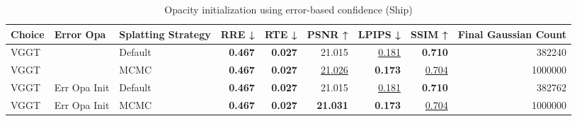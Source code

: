 \begin{table}[H]
\caption{Opacity initialization using error-based confidence (Ship)}
\label{tab:05_error_opa_ship}
\begin{tabular}{lllrrrrrr}
\toprule
Choice & Error Opa & Splatting Strategy & RRE ↓ & RTE ↓ & PSNR ↑ & LPIPS ↓ & SSIM ↑ & Final Gaussian Count \\
\midrule
VGGT &  & Default & \textbf{0.467} & \textbf{0.027} & 21.015 & \underline{0.181} & \textbf{0.710} & 382240 \\
VGGT &  & MCMC & \textbf{0.467} & \textbf{0.027} & \underline{21.026} & \textbf{0.173} & \underline{0.704} & 1000000 \\
VGGT & Err Opa Init & Default & \textbf{0.467} & \textbf{0.027} & 21.015 & \underline{0.181} & \textbf{0.710} & 382762 \\
VGGT & Err Opa Init & MCMC & \textbf{0.467} & \textbf{0.027} & \textbf{21.031} & \textbf{0.173} & \underline{0.704} & 1000000 \\
\bottomrule
\end{tabular}
\end{table}
